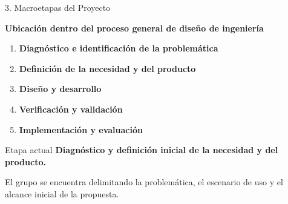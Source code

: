 \documentclass[10pt, aspectratio=169]{beamer}
\begin{document}
\begin{frame}{3. Macroetapas del Proyecto}

    \textbf{Ubicación dentro del proceso general de diseño de ingeniería}

    \vspace{0.25cm}

     \begin{enumerate}
    
        \item
        \textbf{Diagnóstico e identificación de la problemática}
    
        \vspace{0.12cm}
    
        \item
        \textbf{Definición de la necesidad y del producto}
    
        \vspace{0.12cm}
    
        \item
        \textbf{Diseño y desarrollo}
    
        \vspace{0.12cm}
    
        \item
        \textbf{Verificación y validación}
    
        \vspace{0.12cm}
    
        \item
        \textbf{Implementación y evaluación}
    
    \end{enumerate}

    \vspace{0.25cm}

    \begin{alertblock}{Etapa actual}
        \centering
        \textbf{
            Diagnóstico y definición inicial de la necesidad y del producto.
        }
    
        \vspace{0.05cm}
    
        El grupo se encuentra delimitando la problemática,
        el escenario de uso y el alcance inicial de la propuesta.
    \end{alertblock}

\end{frame}


\end{document}
